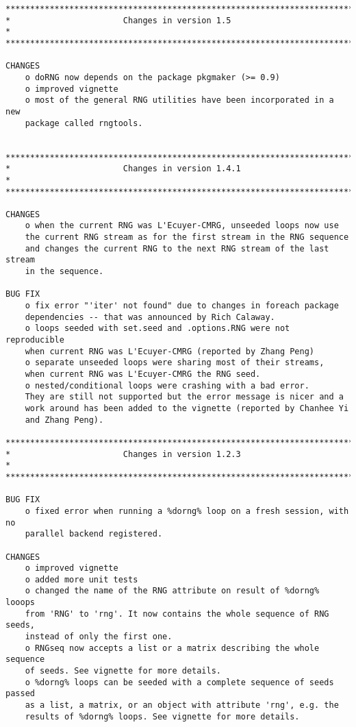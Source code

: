 \documentclass[a4paper,12pt]{article}\usepackage{graphicx, color}
\begin{document}
{\scriptsize
\begin{verbatim}
*************************************************************************
*                       Changes in version 1.5                          *
*************************************************************************

CHANGES
    o doRNG now depends on the package pkgmaker (>= 0.9)
    o improved vignette
    o most of the general RNG utilities have been incorporated in a new
    package called rngtools.
    

*************************************************************************
*                       Changes in version 1.4.1                        *
*************************************************************************

CHANGES
    o when the current RNG was L'Ecuyer-CMRG, unseeded loops now use 
    the current RNG stream as for the first stream in the RNG sequence 
    and changes the current RNG to the next RNG stream of the last stream 
    in the sequence. 

BUG FIX
    o fix error "'iter' not found" due to changes in foreach package 
    dependencies -- that was announced by Rich Calaway.
    o loops seeded with set.seed and .options.RNG were not reproducible
    when current RNG was L'Ecuyer-CMRG (reported by Zhang Peng)
    o separate unseeded loops were sharing most of their streams, 
    when current RNG was L'Ecuyer-CMRG the RNG seed.
    o nested/conditional loops were crashing with a bad error. 
    They are still not supported but the error message is nicer and a 
    work around has been added to the vignette (reported by Chanhee Yi 
    and Zhang Peng).

*************************************************************************
*                       Changes in version 1.2.3                        *
*************************************************************************

BUG FIX
    o fixed error when running a %dorng% loop on a fresh session, with no  
    parallel backend registered.  

CHANGES
    o improved vignette
    o added more unit tests
    o changed the name of the RNG attribute on result of %dorng% looops 
    from 'RNG' to 'rng'. It now contains the whole sequence of RNG seeds, 
    instead of only the first one.
    o RNGseq now accepts a list or a matrix describing the whole sequence 
    of seeds. See vignette for more details.
    o %dorng% loops can be seeded with a complete sequence of seeds passed 
    as a list, a matrix, or an object with attribute 'rng', e.g. the 
    results of %dorng% loops. See vignette for more details.
    

\end{verbatim}}
\end{document}
